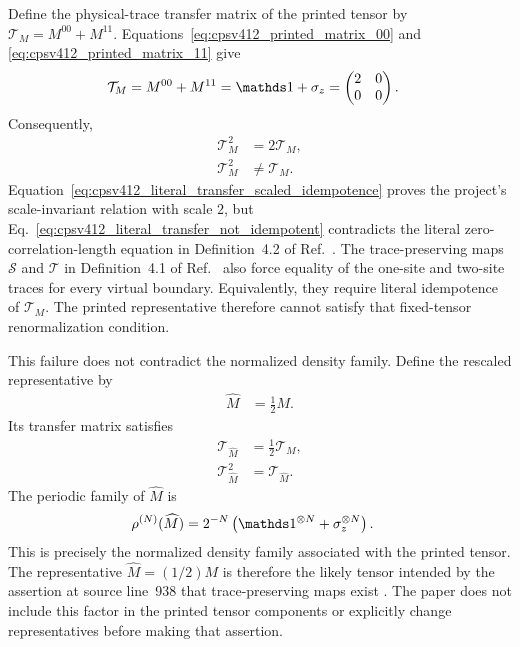 \documentclass{article}
\begin{document}
Define the physical-trace transfer matrix of the printed tensor by
$\mathcal T_M=M^{00}+M^{11}$. Equations~\ref{eq:cpsv412_printed_matrix_00}
and \ref{eq:cpsv412_printed_matrix_11} give
\begin{align}
    \mathcal T_M
        &= M^{00}+M^{11}
         = \Id+\sigma_z
         = \begin{pmatrix}
               2 & 0\\
               0 & 0
           \end{pmatrix}.
    \label{eq:cpsv412_literal_transfer}
\end{align}
Consequently,
\begin{align}
    \mathcal T_M^2
        &= 2\mathcal T_M,
    \label{eq:cpsv412_literal_transfer_scaled_idempotence}\\
    \mathcal T_M^2
        &\neq \mathcal T_M.
    \label{eq:cpsv412_literal_transfer_not_idempotent}
\end{align}
Equation~\ref{eq:cpsv412_literal_transfer_scaled_idempotence} proves the
project's scale-invariant relation with scale $2$, but
Eq.~\ref{eq:cpsv412_literal_transfer_not_idempotent} contradicts the literal
zero-correlation-length equation in Definition~4.2 of
Ref.~\cite{Cirac2016MPDO_arXiv}. The trace-preserving maps $\mathcal S$ and
$\mathcal T$ in Definition~4.1 of Ref.~\cite{Cirac2016MPDO_arXiv} also force
equality of the one-site and two-site traces for every virtual boundary.
Equivalently, they require literal idempotence of $\mathcal T_M$. The printed
representative therefore cannot satisfy that fixed-tensor renormalization
condition.

This failure does not contradict the normalized density family. Define the
rescaled representative by
\begin{align}
    \widehat M
        &= \frac{1}{2}M.
    \label{eq:cpsv412_normalized_representative}
\end{align}
Its transfer matrix satisfies
\begin{align}
    \mathcal T_{\widehat M}
        &= \frac{1}{2}\mathcal T_M,
    \label{eq:cpsv412_normalized_transfer}\\
    \mathcal T_{\widehat M}^2
        &= \mathcal T_{\widehat M}.
    \label{eq:cpsv412_normalized_transfer_idempotent}
\end{align}
The periodic family of $\widehat M$ is
\begin{align}
    \rho^{(N)}(\widehat M)
        &= 2^{-N}\left(\Id^{\otimes N}+\sigma_z^{\otimes N}\right).
    \label{eq:cpsv412_normalized_periodic_family}
\end{align}
This is precisely the normalized density family associated with the printed
tensor. The representative $\widehat M=(1/2)M$ is therefore the likely tensor
intended by the assertion at source line~938 that trace-preserving maps exist
\cite{Cirac2016MPDO_arXiv}. The paper does not include this factor in the
printed tensor components or explicitly change representatives before making
that assertion.
\end{document}
